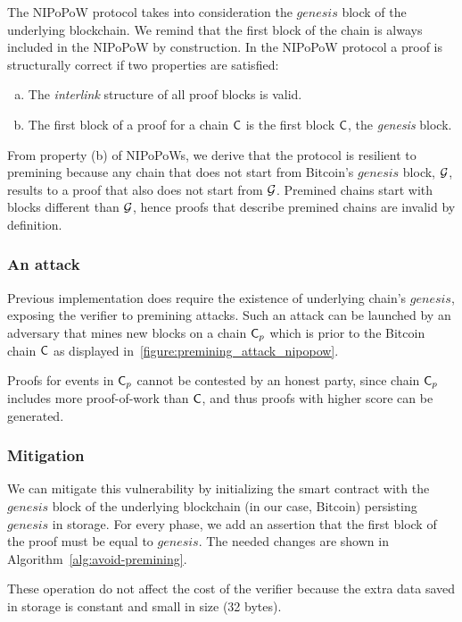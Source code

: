 

The NIPoPoW protocol takes into consideration the $genesis$ block of the
underlying blockchain. We remind that the first block of the chain is always
included in the NIPoPoW by construction. In the NIPoPoW protocol a proof is
structurally correct if two properties are satisfied:

\begin{enumerate}[(a)]

\item The \emph{interlink} structure of all proof blocks is valid.

\item The first block of a proof for a chain $\mathsf{C}$ is the first block
    $\mathsf{C}$, the \emph{genesis} block.

\end{enumerate}

From property (b) of NIPoPoWs, we derive that the protocol is resilient to
premining because any chain that does not start from Bitcoin's $genesis$ block,
$\mathcal{G}$, results to a proof that also does not start from $\mathcal{G}$. Premined
chains start with blocks different than $\mathcal{G}$, hence proofs that describe
premined chains are invalid by definition.

\subsubsection{An attack} Previous implementation does require the existence of
underlying chain's $genesis$, exposing the verifier to premining attacks. Such
an attack can be launched by an adversary that mines new blocks on a chain
$\mathsf{C}_p$ which is prior to the Bitcoin chain $\mathsf{C}$ as displayed
in~\ref{figure:premining_attack_nipopow}.


Proofs for events in $\mathsf{C}_p$ cannot be contested by an honest party, since
chain $\mathsf{C}_p$ includes more proof-of-work than $\mathsf{C}$, and thus proofs
with higher score can be generated.

\subsubsection{Mitigation}

We can mitigate this vulnerability by initializing the smart contract with the
$genesis$ block of the underlying blockchain (in our case, Bitcoin) persisting
$genesis$ in storage. For every phase, we add an assertion that the first block
of the proof must be equal to $genesis$. The needed changes are shown in
Algorithm~\ref{alg:avoid-premining}.

These operation do not affect the cost of the verifier because the extra data
saved in storage is constant and small in size (32 bytes).


